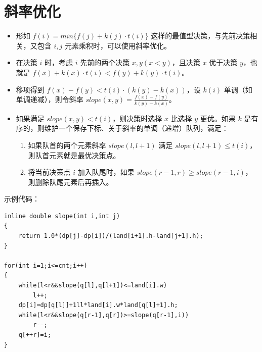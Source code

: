 \section{斜率优化}

\begin{itemize}
\item 形如 $f(i) = min\{f(j) + k(j) \cdot t(i)\}$ 这样的最值型决策，与先前决策相关，又包含 $i,j$ 元素乘积时，可以使用斜率优化。
\item 在决策 $i$ 时，考虑 $i$ 先前的两个决策 $x, y (x < y)$，且决策 $x$ 优于决策 $y$，也就是 $f(x)+k(x) \cdot t(i) < f(y) + k(y)\cdot t(i)$。
\item 移项得到 $f(x)-f(y) < t(i) \cdot (k(y)-k(x))$，设 $k(i)$ 单调（如单调递减），则令斜率 $slope(x, y) = \frac{f(x)-f(y)}{k(y)-k(x)}$。
\item 如果满足 $slope(x, y) < t(i)$，则决策时选择 $x$ 比选择 $y$ 更优。如果 $k$ 是有序的，则维护一个保存下标、关于斜率的单调（递增）队列，满足：
\begin{enumerate}
\item 如果队首的两个元素斜率 $slope(l, l+1)$ 满足 $slope(l, l+1) \leq t(i)$，则队首元素就是最优决策点。
\item 将当前决策点 $i$ 加入队尾时，如果 $slope(r-1, r) \geq slope(r-1, i)$，则删除队尾元素后再插入。
\end{enumerate}
\end{itemize}

\noindent 示例代码：
\begin{verbatim}
inline double slope(int i,int j)
{
    return 1.0*(dp[j]-dp[i])/(land[i+1].h-land[j+1].h);
}

for(int i=1;i<=cnt;i++)
{
    while(l<r&&slope(q[l],q[l+1])<=land[i].w)
        l++;
    dp[i]=dp[q[l]]+1ll*land[i].w*land[q[l]+1].h;
    while(l<r&&slope(q[r-1],q[r])>=slope(q[r-1],i))
        r--;
    q[++r]=i;
}
\end{verbatim}